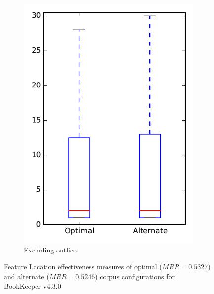 \begin{figure}
\begin{subfigure}{.4\textwidth}
        \includegraphics[height=0.4\textheight]{figures/combo/flt_rq2_bookkeeper_no_outlier}
        \caption{Excluding outliers}\label{fig:combo:flt:rq2:bookkeeper_no_outlier}
    \end{subfigure}
\caption[Feature Location effectiveness measures of optimal and alternate corpus configurations for BookKeeper v4.3.0]%
{Feature Location effectiveness measures of optimal ($MRR=0.5327$) and alternate ($MRR=0.5246$) corpus configurations for BookKeeper v4.3.0}
\label{fig:combo:flt:rq2:bookkeeper}
\end{figure}
